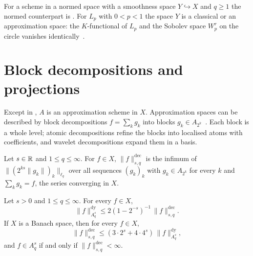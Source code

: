 For a scheme in a normed space with a smoothness space $Y \hookrightarrow X$ and $q \geq 1$ the
normed counterpart is . For $L_p$ with $0 < p < 1$ the space $Y$ is a
classical or an approximation space: the $K$-functional of $L_p$ and the Sobolev space $W^r_p$
on the circle vanishes identically~\cite{DitzianHristovIvanov1995}.

\chapter{Block decompositions and projections}
\label{ch:decompositions}

Except in , $A$ is an approximation scheme in $X$.
Approximation spaces can be described by block decompositions $f = \sum_k g_k$ into blocks
$g_k \in A_{2^k}$~\cite[Chapter~7, \S 5]{DeVoreLorentz}.
Each block is a whole level; atomic decompositions refine the blocks into localised atoms with
coefficients, and wavelet decompositions expand them in a basis.

\begin{definition}
\label{def:block-decomposition}
\leanok
{}
Let $s \in \mathbb{R}$ and $1 \leq q \leq \infty$. For $f \in X$, $\|f\|^{\mathrm{dec}}_{s,q}$ is
the infimum of $\|(2^{ks} \|g_k\|)_k\|_{\ell_q}$ over all sequences $(g_k)_k$ with
$g_k \in A_{2^k}$ for every $k$ and $\sum_k g_k = f$, the series converging in $X$.
\end{definition}

\begin{theorem}
\label{thm:block-decomposition}
\leanok
{}
Let $s > 0$ and $1 \leq q \leq \infty$. For every $f \in X$,
\[
  \|f\|^{\mathrm{dy}}_{A^s_q} \leq 2 (1 - 2^{-s})^{-1} \, \|f\|^{\mathrm{dec}}_{s,q} .
\]
If $X$ is a Banach space, then for every $f \in X$,
\[
  \|f\|^{\mathrm{dec}}_{s,q} \leq (3 \cdot 2^s + 4 \cdot 4^s) \, \|f\|^{\mathrm{dy}}_{A^s_q},
\]
and $f \in A^s_q$ if and only if $\|f\|^{\mathrm{dec}}_{s,q} < \infty$.
\end{theorem}

